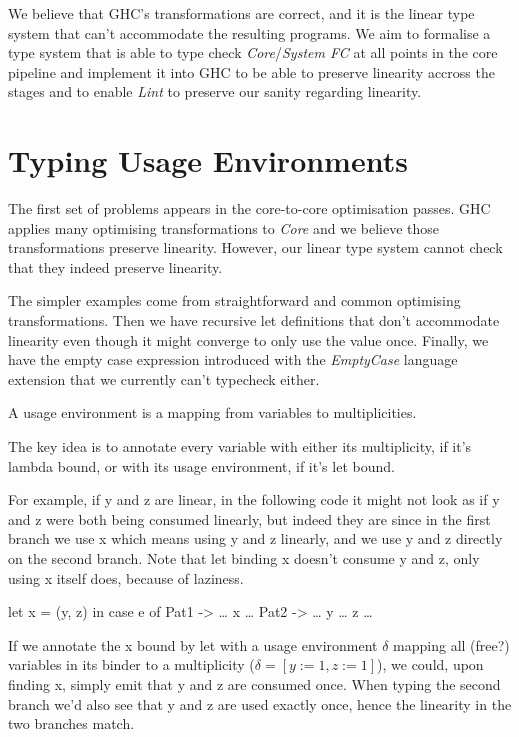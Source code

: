 \documentclass[a4paper, draft]{article}
\begin{document}
We believe that GHC's transformations are correct, and it is the linear type
system that can't accommodate the resulting programs. We aim to formalise a type
system that is able to type check \emph{Core}/\emph{System FC} at all points in
the core pipeline and implement it into GHC to be able to preserve linearity
accross the stages and to enable \emph{Lint} to preserve our sanity regarding
linearity.


\section{Typing Usage Environments}

The first set of problems appears in the core-to-core optimisation passes. GHC
applies many optimising transformations to \emph{Core} and we believe those
transformations preserve linearity. However, our linear type system cannot check
that they indeed preserve linearity.

The simpler examples come from straightforward and common optimising
transformations. Then we have recursive let definitions that don't accommodate
linearity even though it might converge to only use the value once. Finally, we
have the empty case expression introduced with the \emph{EmptyCase} language
extension that we currently can't typecheck either.


A usage environment is a mapping from variables to multiplicities.

The key idea is to annotate every variable with either its multiplicity, if it's
lambda bound, or with its usage environment, if it's let bound.

For example, if y and z are linear, in the following code it might not look as
if y and z were both being consumed linearly, but indeed they are since in the
first branch we use x which means using y and z linearly, and we use y and z
directly on the second branch. Note that let binding x doesn't consume y and z,
only using x itself does, because of laziness.
\begin{code}
let x = (y, z) in
case e of
  Pat1 -> … x …
  Pat2 -> … y … z …
\end{code}

If we annotate the x bound by let with a usage environment $\delta$ mapping all (free?)
variables in its binder to a multiplicity ($\delta = [y := 1, z := 1]$), we
could, upon finding x, simply emit that y and z are consumed once. When typing
the second branch we'd also see that y and z are used exactly once, hence the
linearity in the two branches match.
\end{document}
